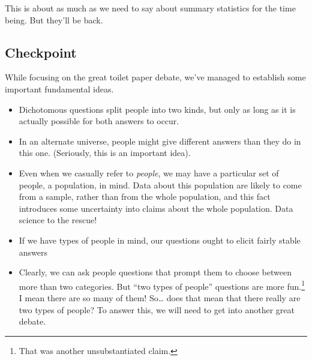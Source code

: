 \documentclass[
  openany]{book}
\begin{document}
This is about as much as we need to say about summary statistics for the time being. But they'll be back.

\hypertarget{checkpoint}{%
\subsection*{Checkpoint}\label{checkpoint}}

While focusing on the great toilet paper debate, we've managed to establish some important fundamental ideas.

\begin{itemize}
\item
  Dichotomous questions split people into two kinds, but only as long as it is actually possible for both answers to occur.
\item
  In an alternate universe, people might give different answers than they do in this one. (Seriously, this is an important idea).
\item
  Even when we casually refer to \emph{people}, we may have a particular set of people, a population, in mind. Data about this population are likely to come from a sample, rather than from the whole population, and this fact introduces some uncertainty into claims about the whole population. Data science to the rescue!
\item
  If we have types of people in mind, our questions ought to elicit fairly stable answers
\item
  Clearly, we can ask people questions that prompt them to choose between more than two categories. But ``two types of people'' questions are more fun.\footnote{That was another unsubstantiated claim.} I mean there are so many of them! So\ldots{} does that mean that there really are two types of people? To answer this, we will need to get into another great debate.
\end{itemize}

  
\end{document}

